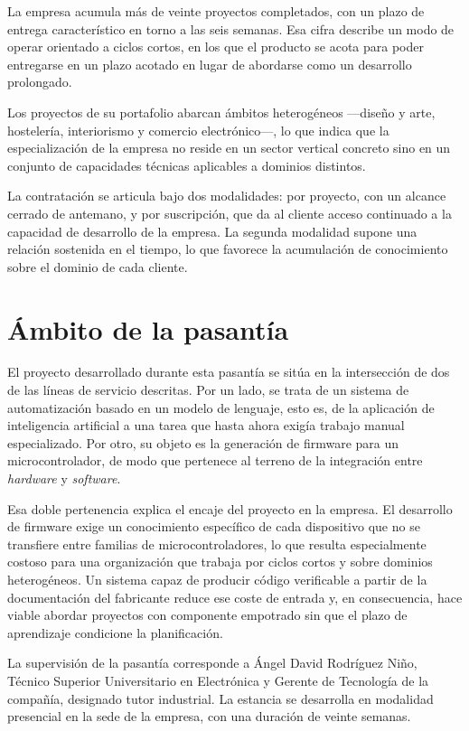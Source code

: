 La empresa acumula más de veinte proyectos completados, con un plazo de entrega
característico en torno a las seis semanas. Esa cifra describe un modo de operar
orientado a ciclos cortos, en los que el producto se acota para poder entregarse
en un plazo acotado en lugar de abordarse como un desarrollo prolongado.

Los proyectos de su portafolio abarcan ámbitos heterogéneos —diseño y arte,
hostelería, interiorismo y comercio electrónico—, lo que indica que la
especialización de la empresa no reside en un sector vertical concreto sino en un
conjunto de capacidades técnicas aplicables a dominios distintos.

La contratación se articula bajo dos modalidades: por proyecto, con un alcance
cerrado de antemano, y por suscripción, que da al cliente acceso continuado a la
capacidad de desarrollo de la empresa. La segunda modalidad supone una relación
sostenida en el tiempo, lo que favorece la acumulación de conocimiento sobre el
dominio de cada cliente.

\section{Ámbito de la pasantía}

El proyecto desarrollado durante esta pasantía se sitúa en la intersección de dos
de las líneas de servicio descritas. Por un lado, se trata de un sistema de
automatización basado en un modelo de lenguaje, esto es, de la aplicación de
inteligencia artificial a una tarea que hasta ahora exigía trabajo manual
especializado. Por otro, su objeto es la generación de firmware para un
microcontrolador, de modo que pertenece al terreno de la integración entre
\emph{hardware} y \emph{software}.

Esa doble pertenencia explica el encaje del proyecto en la empresa. El desarrollo
de firmware exige un conocimiento específico de cada dispositivo que no se
transfiere entre familias de microcontroladores, lo que resulta especialmente
costoso para una organización que trabaja por ciclos cortos y sobre dominios
heterogéneos. Un sistema capaz de producir código verificable a partir de la
documentación del fabricante reduce ese coste de entrada y, en consecuencia, hace
viable abordar proyectos con componente empotrado sin que el plazo de aprendizaje
condicione la planificación.

La supervisión de la pasantía corresponde a Ángel David Rodríguez Niño, Técnico
Superior Universitario en Electrónica y Gerente de Tecnología de la compañía,
designado tutor industrial. La estancia se desarrolla en modalidad presencial en
la sede de la empresa, con una duración de veinte semanas.
